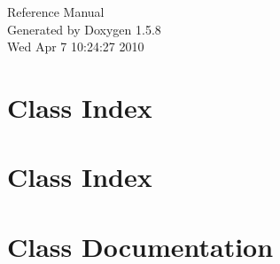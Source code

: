\documentclass[a4paper]{book}
\begin{document}
\begin{titlepage}
\vspace*{7cm}
\begin{center}
{\Large Reference Manual}\\
\vspace*{1cm}
{\large Generated by Doxygen 1.5.8}\\
\vspace*{0.5cm}
{\small Wed Apr 7 10:24:27 2010}\\
\end{center}
\end{titlepage}
\clearemptydoublepage
{}
\tableofcontents
\clearemptydoublepage
{}
\chapter{Class Index}

\chapter{Class Index}

\chapter{Class Documentation}



































\printindex
\end{document}
